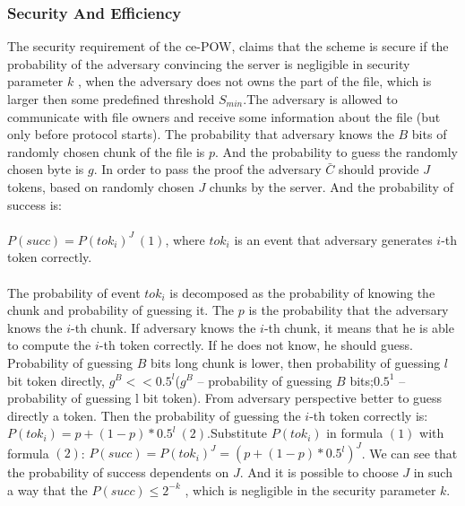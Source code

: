 \documentclass[12pt]{article}
\begin{document}
\subsubsection{Security And Efficiency}
\label{subsub:secAndeff7}
The security requirement of the ce-POW, claims that the scheme is secure if the probability of the adversary convincing the server is negligible in security parameter $k$ , when the adversary does not owns the part of the file, which is larger then some predefined threshold $S_{min}$.The adversary is allowed to communicate with file owners and receive some information about the file (but only before protocol starts). The probability that adversary knows the $B$ bits of randomly chosen chunk of the file is $p$. And the probability to guess the randomly chosen byte is $g$. In order to pass the proof the adversary $\bar{C}$ should provide $J$ tokens, based on randomly chosen $J$ chunks by the server. And the probability of success is:\\\\
$P(succ) = P(tok_i)^J\ (1)$, where $tok_i$ is an event that  adversary generates $i$-th token correctly.\\\\
The probability of event $tok_i$ is decomposed as the probability of knowing the chunk and probability of guessing it. The $p$ is the probability that the adversary knows the $i$-th chunk.  If adversary knows the $i$-th chunk, it means that he is able to compute the $i$-th token correctly. If he does not know, he should guess. Probability of guessing $B$ bits long chunk is lower, then probability of guessing $l$ bit token directly, $g^B << 0.5^l$($g^B$ -- probability of guessing $B$ bits;$0.5^1$ -- probability of guessing l bit token). From adversary perspective better to guess directly a token. Then the probability of guessing the $i$-th token correctly is:  $P(tok_i)=p+(1-p)*0.5^l\ (2)$.Substitute $P(tok_i)$ in  formula $(1)$ with  formula $(2)$: $P(succ) = P(tok_i)^J = (p+(1-p)*0.5^l)^J$. We can see that the probability of success dependents on $J$. And it is possible to choose $J$ in such a way that the $P(succ) \leq 2^{-k}$ , which is negligible in the security parameter $k$.\\\\
\end{document}
